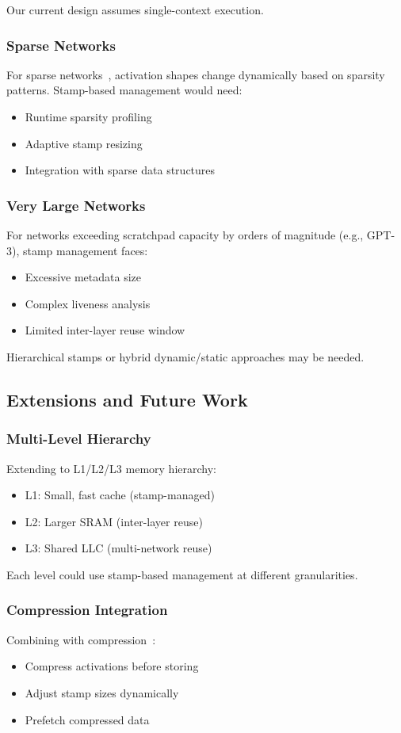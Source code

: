 \documentclass[journal]{IEEEtran}
\begin{document}
Our current design assumes single-context execution.

\subsubsection{Sparse Networks}
For sparse networks~\cite{han2015deep}, activation shapes change dynamically based on sparsity patterns. Stamp-based management would need:
\begin{itemize}
\item Runtime sparsity profiling
\item Adaptive stamp resizing
\item Integration with sparse data structures
\end{itemize}

\subsubsection{Very Large Networks}
For networks exceeding scratchpad capacity by orders of magnitude (e.g., GPT-3), stamp management faces:
\begin{itemize}
\item Excessive metadata size
\item Complex liveness analysis
\item Limited inter-layer reuse window
\end{itemize}

Hierarchical stamps or hybrid dynamic/static approaches may be needed.

\subsection{Extensions and Future Work}

\subsubsection{Multi-Level Hierarchy}
Extending to L1/L2/L3 memory hierarchy:
\begin{itemize}
\item L1: Small, fast cache (stamp-managed)
\item L2: Larger SRAM (inter-layer reuse)
\item L3: Shared LLC (multi-network reuse)
\end{itemize}

Each level could use stamp-based management at different granularities.

\subsubsection{Compression Integration}
Combining with compression~\cite{han2015deep}:
\begin{itemize}
\item Compress activations before storing
\item Adjust stamp sizes dynamically
\item Prefetch compressed data
\end{itemize}
\end{document}
